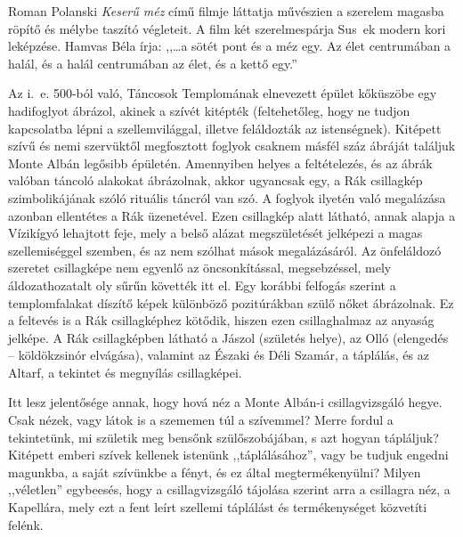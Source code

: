 Roman Polanski \textit{Keserű méz} című filmje láttatja művészien a
szerelem magasba röpítő és mélybe taszító végleteit. A film két
szerelmespárja Sus~ek modern kori leképzése. Hamvas Béla írja:
,,\dots a sötét pont
és a méz egy. Az élet centrumában a halál, és a halál centrumában az
élet, és a kettő egy.''

Az i.~e. 500-ból való, Táncosok Templomának elnevezett épület kőküszöbe
egy hadifoglyot ábrázol, akinek a szívét kitépték (feltehetőleg, hogy
ne tudjon kapcsolatba lépni a szellemvilággal, illetve feláldozták az
istenségnek). Kitépett szívű és nemi szervüktől megfosztott foglyok csaknem
másfél száz ábráját találjuk Monte Albán legősibb épületén. Amennyiben
helyes a feltételezés, és az ábrák valóban táncoló alakokat ábrázolnak,
akkor ugyancsak egy, a Rák csillagkép szimbolikájának szóló rituális
táncról van szó. A foglyok ilyetén való megalázása azonban ellentétes a
Rák üzenetével. Ezen csillagkép alatt látható, annak alapja a Vízikígyó
lehajtott feje, mely a belső alázat megszületését jelképezi a magas
szellemiséggel szemben, és az nem szólhat mások megalázásáról. Az önfeláldozó
szeretet csillagképe nem egyenlő az öncsonkítással, megsebzéssel, mely
áldozathozatalt oly sűrűn követték itt el. Egy korábbi felfogás szerint a
templomfalakat díszítő képek különböző pozitúrákban szülő nőket ábrázolnak.
Ez a feltevés is a Rák csillagképhez kötődik, hiszen ezen csillaghalmaz
az anyaság jelképe. A Rák csillagképben látható a Jászol (születés
helye), az Olló (elengedés -- köldökzsinór elvágása), valamint az Északi és
Déli Szamár, a táplálás, és az Altarf, a tekintet és megnyílás csillagképei.

Itt lesz jelentősége annak, hogy hová néz a Monte Albán-i csillagvizsgáló
hegye. Csak nézek, vagy látok is a szememen túl a szívemmel?
Merre fordul a tekintetünk, mi születik meg bensőnk szülőszobájában,
s azt hogyan tápláljuk? Kitépett emberi szívek kellenek istenünk
,,táplálásához'', vagy be tudjuk engedni magunkba, a saját szívünkbe a
fényt, és ez által megtermékenyülni? Milyen ,,véletlen'' egybeesés, hogy
a csillagvizsgáló tájolása szerint arra a csillagra néz, a Kapellára, mely
ezt a fent leírt szellemi táplálást és termékenységet közvetíti felénk.

